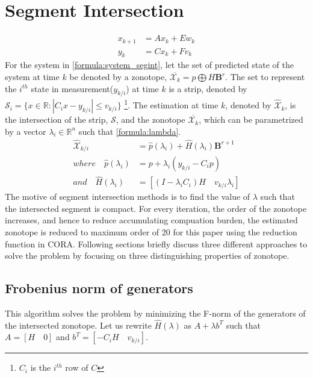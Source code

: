 \section{Segment Intersection} 
\begin{equation}
\label{formula:system_segint}
\begin{split}
x_{k+1} &= Ax_k + Ew_k\\
y_k &= Cx_k + Fv_k
\end{split}
\end{equation}
For the system in \eqref{formula:system_segint}, let the set of predicted state of the system at time $k$ be denoted by a zonotope, $\overline{\mathcal{X}_k} = p\bigoplus H \textbf{B}^r$. The set to represent the $i^{th}$ state in measurement($y_{k/i}$) at time $k$ is a strip, denoted by $\mathscr{S}_i = \{x \in \mathbb{R} : |C_i x - y_{k/i}| \leq v_{k/i}\}$ \footnote{$C_i$ is the $i^{th}$ row of $C$}. The estimation at time $k$, denoted by $\mathcal{\hat{X}}_k$, is the intersection of the strip, $\mathscr{S}$, and the zonotope $\overline{\mathcal{X}_k}$, which can be parametrized by a vector $\lambda_i \in \mathbb{R}^n$ such that \eqref{formula:lambda}. 
\begin{equation}
\label{formula:lambda}
\begin{split}
\mathcal{\hat{X}}_{k/i} &= \hat{p}(\lambda_i) + \hat{H}(\lambda_i)\textbf{B}^{r+1}  \\
where \quad \hat{p}(\lambda_i) &= p+ \lambda_i(y_{k/i} - C_ip)\\
and \quad \hat{H}(\lambda_i) &= [(I- \lambda_i C_i) H \quad v_{k/i}\lambda_i ]
\end{split}
\end{equation}
The motive of segment intersection methods is to find the value of $\lambda$ such that the intersected segment is compact. For every iteration, the order of the zonotope increases, and hence to reduce accumulating compuation burden, the estimated zonotope is reduced to maximum order of 20 for this paper using the reduction function in CORA. Following sections briefly discuss three different approaches to solve the problem by focusing on three distinguishing properties of zonotope.

\subsection{Frobenius norm of generators}
This algorithm solves the problem by minimizing the F-norm of the generators of the intersected zonotope. Let us rewrite $\hat{H}(\lambda)$ as $A+ \lambda b^T$ such that $A= [H \quad 0]$ and $b^T = [-C_i H \quad v_{k/i}]$.

